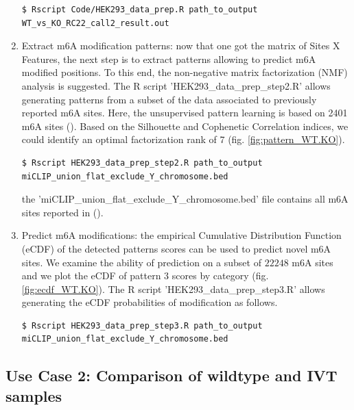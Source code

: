\documentclass[times, 11pt, a4paper]{article}
\begin{document}
\begin{enumerate}
	\begin{verbatim} 
$ Rscript Code/HEK293_data_prep.R path_to_output WT_vs_KO_RC22_call2_result.out
\end{verbatim}
\item Extract m6A modification patterns: now that one got the matrix of Sites X Features, the next step is to extract patterns allowing to predict m6A modified positions. To this end, the non-negative matrix factorization (NMF) analysis is suggested. The R script 'HEK293\_data\_prep\_step2.R' allows generating patterns from a subset of the data associated to previously reported m6A sites. Here, the unsupervised pattern learning is based on 2401 m6A sites (). Based on the Silhouette and Cophenetic Correlation indices, we could identify an optimal factorization rank of 7 (fig. \ref{fig:pattern_WT.KO}).
	\begin{verbatim} 
$ Rscript HEK293_data_prep_step2.R path_to_output miCLIP_union_flat_exclude_Y_chromosome.bed
	\end{verbatim} 
	the 'miCLIP\_union\_flat\_exclude\_Y\_chromosome.bed' file contains all m6A sites reported in (). 
\item Predict m6A modifications: the empirical Cumulative Distribution Function (eCDF) of the detected patterns scores can be used to predict novel m6A sites. We examine the ability of prediction on a subset of $22248$ m6A sites and we plot the eCDF of pattern 3 scores by category (fig. \ref{fig:ecdf_WT.KO}). The R script 'HEK293\_data\_prep\_step3.R' allows generating the eCDF probabilities of modification as follows.
	\begin{verbatim} 
$ Rscript HEK293_data_prep_step3.R path_to_output miCLIP_union_flat_exclude_Y_chromosome.bed
\end{verbatim} 
	
\end{enumerate}
\subsection*{Use Case 2: Comparison of wildtype and IVT samples}
\end{document}
